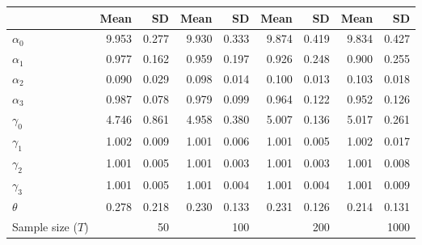 
\begin{tabular}[t]{lrrrrrrrr}
\toprule
  & Mean & SD & Mean  & SD  & Mean   & SD   & Mean    & SD   \\
\midrule
$\alpha_{0}$ & 9.953 & 0.277 & 9.930 & 0.333 & 9.874 & 0.419 & 9.834 & 0.427\\
$\alpha_{1}$ & 0.977 & 0.162 & 0.959 & 0.197 & 0.926 & 0.248 & 0.900 & 0.255\\
$\alpha_{2}$ & 0.090 & 0.029 & 0.098 & 0.014 & 0.100 & 0.013 & 0.103 & 0.018\\
$\alpha_{3}$ & 0.987 & 0.078 & 0.979 & 0.099 & 0.964 & 0.122 & 0.952 & 0.126\\
$\gamma_{0}$ & 4.746 & 0.861 & 4.958 & 0.380 & 5.007 & 0.136 & 5.017 & 0.261\\
$\gamma_{1}$ & 1.002 & 0.009 & 1.001 & 0.006 & 1.001 & 0.005 & 1.002 & 0.017\\
$\gamma_{2}$ & 1.001 & 0.005 & 1.001 & 0.003 & 1.001 & 0.003 & 1.001 & 0.008\\
$\gamma_{3}$ & 1.001 & 0.005 & 1.001 & 0.004 & 1.001 & 0.004 & 1.001 & 0.009\\
$\theta$ & 0.278 & 0.218 & 0.230 & 0.133 & 0.231 & 0.126 & 0.214 & 0.131\\
Sample size ($T$) &  & 50 &  & 100 &  & 200 &  & 1000\\
\bottomrule
\end{tabular}
